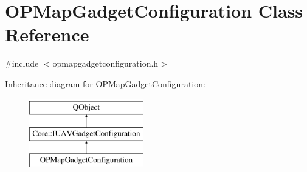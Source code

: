 \hypertarget{class_o_p_map_gadget_configuration}{\section{O\-P\-Map\-Gadget\-Configuration Class Reference}
\label{class_o_p_map_gadget_configuration}
}


{\ttfamily \#include $<$opmapgadgetconfiguration.\-h$>$}

Inheritance diagram for O\-P\-Map\-Gadget\-Configuration\-:\begin{figure}[H]
\begin{center}
\leavevmode
\includegraphics[height=3.000000cm]{class_o_p_map_gadget_configuration}
\end{center}
\end{figure}
